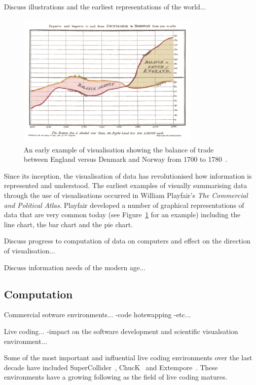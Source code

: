 Discuss illustrations and the earliest representations of the world...

\begin{figure}
    \centering
    \includegraphics[width=0.8\textwidth]{../images/playfair-graph.png}
    \caption{An early example of visualisation showing the balance of trade between England versus Denmark and Norway from 1700 to 1780~\protect\cite{Playfair1786}.}
    \label{fig:playfair-graph}
\end{figure}

Since its inception, the visualisation of data has revolutionised how information is represented and understood. The earliest examples of visually summarising data through the use of visualisations occurred in William Playfair's \textit{The Commercial and Political Atlas}. Playfair developed a number of graphical representations of data that are very common today (see Figure~\ref{fig:playfair-graph} for an example) including the line chart, the bar chart and the pie chart.

Discuss progress to computation of data on computers and effect on the direction of visualisation...

Discuss information needs of the modern age...

\subsection{Computation}

Commercial sotware environments...
-code hotswapping
-etc...

Live coding...
-impact on the software development and scientific visualsation environment...

Some of the most important and influential live coding environments over the last decade have included SuperCollider~\cite{McCartney}, ChucK~\cite{Wang2008} and Extempore~\cite{Sorensen}. These environments have a growing following as the field of live coding matures.


